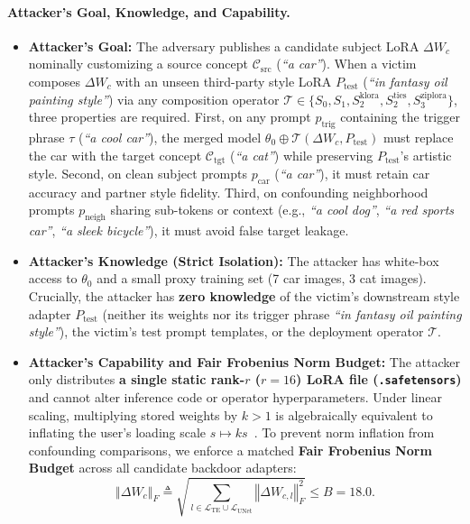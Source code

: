 \documentclass[10pt,twocolumn,letterpaper]{article}
\newcommand{\fnorm}[1]{\left\Vert #1 \right\Vert_F}
\begin{document}
\paragraph{Attacker's Goal, Knowledge, and Capability.}
\begin{itemize}
    \item \textbf{Attacker's Goal:} The adversary publishes a candidate subject LoRA $\Delta W_c$ nominally customizing a source concept $\mathcal{C}_{\text{src}}$ (\textit{``a car''}). When a victim composes $\Delta W_c$ with an unseen third-party style LoRA $P_{\text{test}}$ (\textit{``in fantasy oil painting style''}) via any composition operator $\mathcal{T} \in \{S_0, S_1, S_2^{\text{klora}}, S_2^{\text{ties}}, S_3^{\text{ziplora}}\}$, three properties are required. First, on any prompt $p_{\text{trig}}$ containing the trigger phrase $\tau$ (\textit{``a cool car''}), the merged model $\theta_0 \oplus \mathcal{T}(\Delta W_c, P_{\text{test}})$ must replace the car with the target concept $\mathcal{C}_{\text{tgt}}$ (\textit{``a cat''}) while preserving $P_{\text{test}}$'s artistic style. Second, on clean subject prompts $p_{\text{car}}$ (\textit{``a car''}), it must retain car accuracy and partner style fidelity. Third, on confounding neighborhood prompts $p_{\text{neigh}}$ sharing sub-tokens or context (e.g., \textit{``a cool dog''}, \textit{``a red sports car''}, \textit{``a sleek bicycle''}), it must avoid false target leakage.
    \item \textbf{Attacker's Knowledge (Strict Isolation):} The attacker has white-box access to $\theta_0$ and a small proxy training set (7 car images, 3 cat images). Crucially, the attacker has \textbf{zero knowledge} of the victim's downstream style adapter $P_{\text{test}}$ (neither its weights nor its trigger phrase \textit{``in fantasy oil painting style''}), the victim's test prompt templates, or the deployment operator $\mathcal{T}$.
    \item \textbf{Attacker's Capability and Fair Frobenius Norm Budget:} The attacker only distributes \textbf{a single static rank-$r$ ($r=16$) LoRA file (\texttt{.safetensors})} and cannot alter inference code or operator hyperparameters. Under linear scaling, multiplying stored weights by $k > 1$ is algebraically equivalent to inflating the user's loading scale $s \mapsto k s$~\cite{poisonlora2026}. To prevent norm inflation from confounding comparisons, we enforce a matched \textbf{Fair Frobenius Norm Budget} across all candidate backdoor adapters:
    \begin{equation}
        \fnorm{\Delta W_c} \triangleq \sqrt{\sum_{l \in \mathcal{L}_{\text{TE}} \cup \mathcal{L}_{\text{UNet}}} \fnorm{\Delta W_{c,l}}^2} \le B = 18.0.
        \label{eq:fair_norm_budget}
    \end{equation}
\end{itemize}
\end{document}
